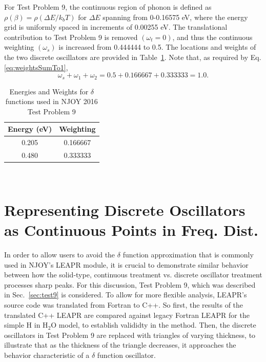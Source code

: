 \documentclass[Master.tex]{subfiles}
\begin{document}
              For Test Problem 9, the continuous region of phonon is defined as $\rho(\beta)=\rho(\Delta E/k_bT)$ for $\Delta E$ spanning from 0-0.16575 eV, where the energy grid is uniformly spaced in increments of 0.00255 eV. The translational contribution to Test Problem 9 is removed $(\omega_t=0)$, and thus the continuous weighting $(\omega_s)$ is increased from 0.444444 to 0.5.  The locations and weights of the two discrete oscillators are provided in Table~\ref{tab:test9_delta_facts}. Note that, as required by Eq.\ref{eq:weightsSumTo1}, 
              \begin{equation}
                \omega_s+\omega_1+\omega_2= 0.5 + 0.166667 + 0.333333 = 1.0.
              \end{equation}
              \begin{table}
              	\centering
                \caption[Energies and Weights for $\delta$ functions used in NJOY 2016 Test Problem 9]{Energies and Weights for $\delta$ functions used in NJOY 2016 Test Problem 9}
              	\label{tab:test9_delta_facts}
                       \begin{tabular}{ |c|c| }\hline
                              Energy (eV)& Weighting\\\hline
                              0.205& 0.166667\\\hline
                              0.480 & 0.333333 \\\hline
                       \end{tabular}\\[1ex]
              \end{table}

 

	\section{Representing Discrete Oscillators as Continuous Points in Freq. Dist.}
                In order to allow users to avoid the $\delta$ function approximation that is commonly used in NJOY's LEAPR module, it is crucial to demonstrate similar behavior between how the solid-type, continuous treatment vs. discrete oscillator treatment processes sharp peaks. For this discussion, Test Problem 9, which was described in Sec.~\ref{sec:test9} is considered. To allow for more flexible analysis, LEAPR's source code was translated from Fortran to C++. So first, the results of the translated C++ LEAPR are compared against legacy Fortran LEAPR for the simple H in H$_2$O model, to establish valididty in the method. Then, the discrete oscillators in Test Problem 9 are replaced with triangles of varying thickness, to illustrate that as the thickness of the triangle decreases, it approaches the behavior characteristic of a $\delta$ function oscillator.
\end{document}
